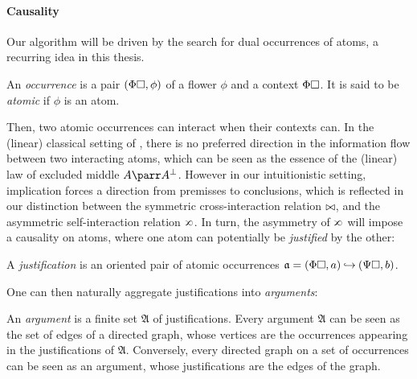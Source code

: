 \paragraph{Causality}

Our algorithm will be driven by the search for dual occurrences of atoms, a
recurring idea in this thesis.

\begin{definition}[Occurrence]
  
  An \emph{occurrence} is a pair $(\Phi\square, \phi)$ of a flower $\phi$ and a
  context $\Phi\square$. It is said to be \emph{atomic} if $\phi$ is an atom.
\end{definition}

Then, two atomic occurrences can interact when their contexts can. In the
(linear) classical setting of \cite{lmcs:1089}, there is no preferred direction
in the information flow between two interacting atoms, which can be seen as the
essence of the (linear) law of excluded middle $A \parr A^\bot$. However in our
intuitionistic setting, implication forces a direction from premisses to
conclusions, which is reflected in our distinction between the symmetric
cross-interaction relation $\mathbin{\bowtie}$, and the asymmetric self-interaction
relation $\sinter$. In turn, the asymmetry of
$\sinter$ will impose a causality on atoms, where one atom can potentially be
\emph{justified} by the other:

\begin{definition}[Justification]
  
  A \emph{justification} is an oriented pair of atomic occurrences $\mathfrak{a}
  = (\Phi\square, a) \mathbin{\hookrightarrow} (\Psi\square, b)$.
\end{definition}

One can then naturally aggregate justifications into \emph{arguments}:

\begin{definition}[Argument]
  
  An \emph{argument} is a finite set $\mathfrak{A}$ of justifications. Every
  argument $\mathfrak{A}$ can be seen as the set of edges of a directed graph,
  whose vertices are the occurrences appearing in the justifications of
  $\mathfrak{A}$. Conversely, every directed graph on a set of occurrences can
  be seen as an argument, whose justifications are the edges of the graph.
\end{definition}

